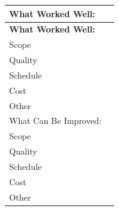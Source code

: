 \documentclass[10pt,letterpaper]{article}
\renewcommand\arraystretch{1.25}
\begin{document}
\begin{center}
\begingroup
\setlength\tabcolsep{2.0pt}
\footnotesize
\renewcommand\arraystretch{1.55}
\begin{longtable}{|>{\raggedright\arraybackslash}p{3.245in}|>{\raggedright\arraybackslash}p{3.245in}|}
\hline
\rowcolor{light}
\textbf{What Worked Well:} & \rule{0pt}{11pt}\hspace{0pt} \\ \hline
\endfirsthead
\hline\rowcolor{light} \textbf{What Worked Well:} & \rule{0pt}{11pt}\hspace{0pt} \\ \hline
\endhead
Scope & \rule{0pt}{11pt}\hspace{0pt} \\ \hline
Quality & \rule{0pt}{11pt}\hspace{0pt} \\ \hline
Schedule & \rule{0pt}{11pt}\hspace{0pt} \\ \hline
Cost & \rule{0pt}{11pt}\hspace{0pt} \\ \hline
Other & \rule{0pt}{11pt}\hspace{0pt} \\ \hline
What Can Be Improved: & \rule{0pt}{11pt}\hspace{0pt} \\ \hline
Scope & \rule{0pt}{11pt}\hspace{0pt} \\ \hline
Quality & \rule{0pt}{11pt}\hspace{0pt} \\ \hline
Schedule & \rule{0pt}{11pt}\hspace{0pt} \\ \hline
Cost & \rule{0pt}{11pt}\hspace{0pt} \\ \hline
Other & \rule{0pt}{11pt}\hspace{0pt} \\ \hline
\end{longtable}
\endgroup
\end{center}
\end{document}

